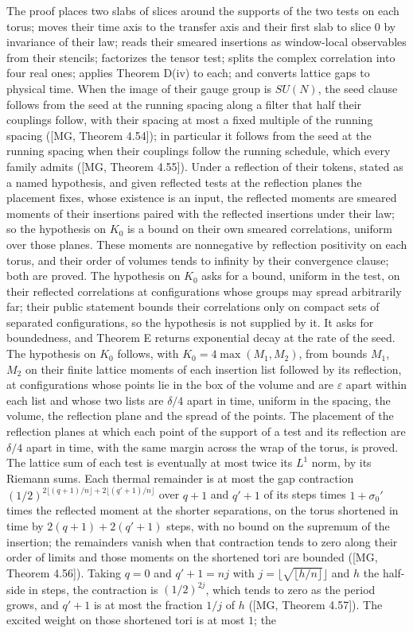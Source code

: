 \documentclass[10pt,letterpaper,twocolumn]{article}
\begin{document}
The proof places two slabs of slices around the supports of the two tests on each torus; moves their time axis to the transfer axis and their first slab to slice \(0\) by invariance of their law; reads their smeared insertions as window-local observables from their stencils; factorizes the tensor test; splits the complex correlation into four real ones; applies Theorem D(iv) to each; and converts lattice gaps to physical time. When the image of their gauge group is \(SU(N)\), the seed clause follows from the seed at the running spacing along a filter that half their couplings follow, with their spacing at most a fixed multiple of the running spacing ({[}MG, Theorem 4.54{]}); in particular it follows from the seed at the running spacing when their couplings follow the running schedule, which every family admits ({[}MG, Theorem 4.55{]}). Under a reflection of their tokens, stated as a named hypothesis, and given reflected tests at the reflection planes the placement fixes, whose existence is an input, the reflected moments are smeared moments of their insertions paired with the reflected insertions under their law; so the hypothesis on \(K_0\) is a bound on their own smeared correlations, uniform over those planes. These moments are nonnegative by reflection positivity on each torus, and their order of volumes tends to infinity by their convergence clause; both are proved. The hypothesis on \(K_0\) asks for a bound, uniform in the test, on their reflected correlations at configurations whose groups may spread arbitrarily far; their public statement bounds their correlations only on compact sets of separated configurations, so the hypothesis is not supplied by it. It asks for boundedness, and Theorem E returns exponential decay at the rate of the seed. The hypothesis on \(K_0\) follows, with \(K_0=4\max(M_1,M_2)\), from bounds \(M_1\), \(M_2\) on their finite lattice moments of each insertion list followed by its reflection, at configurations whose points lie in the box of the volume and are \(\varepsilon\) apart within each list and whose two lists are \(\delta/4\) apart in time, uniform in the spacing, the volume, the reflection plane and the spread of the points. The placement of the reflection planes at which each point of the support of a test and its reflection are \(\delta/4\) apart in time, with the same margin across the wrap of the torus, is proved. The lattice sum of each test is eventually at most twice its \(L^1\) norm, by its Riemann sums. Each thermal remainder is at most the gap contraction \((1/2)^{2\lfloor(q+1)/n\rfloor+2\lfloor(q'+1)/n\rfloor}\) over \(q+1\) and \(q'+1\) of its steps times \(1+\sigma_0'\) times the reflected moment at the shorter separations, on the torus shortened in time by \(2(q+1)+2(q'+1)\) steps, with no bound on the supremum of the insertion; the remainders vanish when that contraction tends to zero along their order of limits and those moments on the shortened tori are bounded ({[}MG, Theorem 4.56{]}). Taking \(q=0\) and \(q'+1=nj\) with \(j=\lfloor\sqrt{\lfloor h/n\rfloor}\rfloor\) and \(h\) the half-side in steps, the contraction is \((1/2)^{2j}\), which tends to zero as the period grows, and \(q'+1\) is at most the fraction \(1/j\) of \(h\) ({[}MG, Theorem 4.57{]}). The excited weight on those shortened tori is at most \(1\); the 
\end{document}
